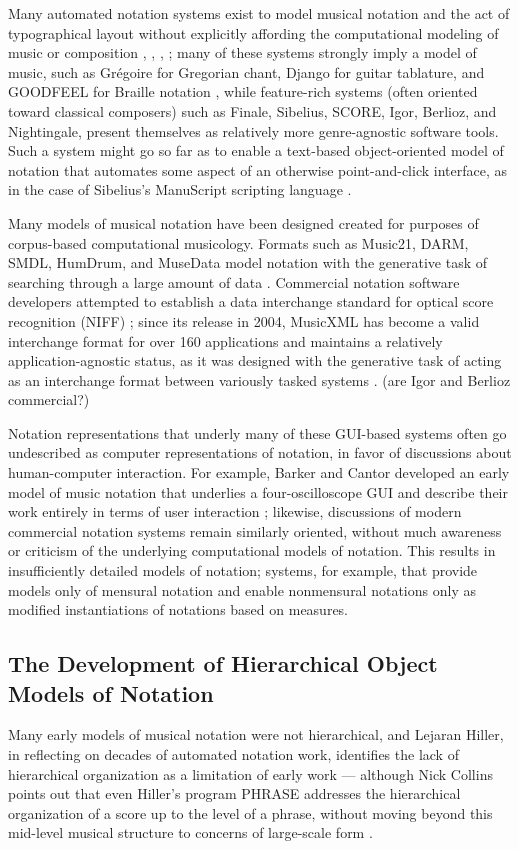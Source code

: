Many automated notation systems exist to model musical notation and the act of typographical layout without explicitly affording the computational modeling of music or composition \cite{Smith:1972mw}, \cite{Nienhuys:2003ve}, \cite{Hoos:1998bd}, \cite{hamel1noteability}; many of these systems strongly imply a model of music, such as Gr\'{e}goire for Gregorian chant, Django for guitar tablature, and GOODFEEL for Braille notation \cite{2006}, while feature-rich systems (often oriented toward classical composers) such as Finale, Sibelius, SCORE, Igor, Berlioz, and Nightingale, present themselves as relatively more genre-agnostic software tools. Such a system might go so far as to enable a text-based object-oriented model of notation that automates some aspect of an otherwise point-and-click interface, as in the case of Sibelius's ManuScript scripting language \cite{Technology:qc}. 

Many models of musical notation have been designed created for purposes of corpus-based computational musicology. Formats such as Music21, DARM, SMDL, HumDrum, and MuseData model notation with the generative task of searching through a large amount of data \cite{Selfridge-Field:1997ud}. Commercial notation software developers attempted to establish a data interchange standard for optical score recognition (NIFF) \cite{niff1995niff}; since its release in 2004, MusicXML has become a valid interchange format for over 160 applications and maintains a relatively application-agnostic status, as it was designed with the generative task of acting as an interchange format between variously tasked systems \cite{Good:2001if}. (are Igor and Berlioz commercial?)

Notation representations that underly many of these GUI-based systems often go undescribed as computer representations of notation, in favor of discussions about human-computer interaction. For example, Barker and Cantor developed an early model of music notation that underlies a four-oscilloscope GUI and describe their work entirely in terms of user interaction \cite{cantor1971computer}; likewise, discussions of modern commercial notation systems remain similarly oriented, without much awareness or criticism of the underlying computational models of notation. This results in insufficiently detailed models of notation; systems, for example, that provide models only of mensural notation and enable nonmensural notations only as modified instantiations of notations based on measures.

\subsection{The Development of Hierarchical Object Models of Notation}
Many early models of musical notation were not hierarchical, and Lejaran Hiller, in reflecting on decades of automated notation work, identifies the lack of hierarchical organization as a limitation of early work --- although Nick Collins points out that even Hiller's program PHRASE addresses the hierarchical organization of a score up to the level of a phrase, without moving beyond this mid-level musical structure to concerns of large-scale form \cite[108]{Collins2009}. 

